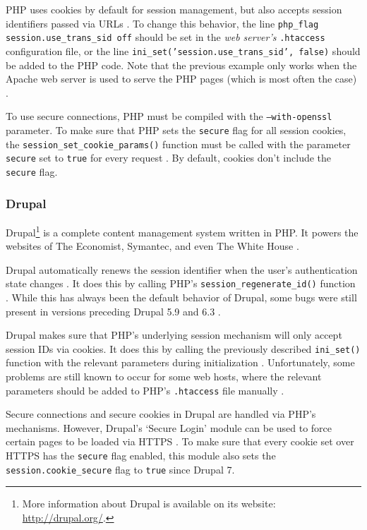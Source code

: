PHP uses cookies by default for session management, but also accepts session identifiers passed via URLs  \cite{Holovaty2008}. To change this behavior, the line \texttt{php\_flag session.use\_trans\_sid\ off} should be set in the \emph{web server's} \texttt{.htaccess} configuration file, or the line \texttt{ini\_set('session.use\_trans\_sid', false)} should be added to the PHP code. Note that the previous example only works when the Apache web server is used to serve the PHP pages (which is most often the case) \cite{PHPdisableURL}.

To use secure connections, PHP must be compiled with the \texttt{--with-openssl} parameter. To make sure that PHP sets the \texttt{secure} flag for all session cookies, the \texttt{session\_set\_cookie\_params()} function must be called with the parameter \texttt{secure} set to \texttt{true} for every request \cite{PHPsessionCookieParams}. By default, cookies don't include the \texttt{secure} flag.

\subsubsection{Drupal}

Drupal\footnote{More information about Drupal is available on its website: \url{http://drupal.org/}.} is a complete content management system written in PHP. It powers the websites of The Economist, Symantec, and even The White House \cite{DrupalCases,DrupalWhiteHouse}.

Drupal automatically renews the session identifier when the user's authentication state changes \cite{DrupalAuth}. It does this by calling PHP's \texttt{session\_regenerate\_id()} function \cite{DrupalRegenerate}. While this has always been the default behavior of Drupal, some bugs were still present in versions preceding Drupal 5.9 and 6.3 \cite{DrupalBug}.

Drupal makes sure that PHP's underlying session mechanism will only accept session IDs via cookies. It does this by calling the previously described \texttt{ini\_set()} function with the relevant parameters during initialization \cite{DrupalSettings}. Unfortunately, some problems are still known to occur for some web hosts, where the relevant parameters should be added to PHP's \texttt{.htaccess} file manually \cite{DrupalSIDurl}.

Secure connections and secure cookies in Drupal are handled via PHP's mechanisms. However, Drupal's `Secure Login' module can be used to force certain pages to be loaded via HTTPS \cite{DrupalSecureLogin}. To make sure that every cookie set over HTTPS has the \texttt{secure} flag enabled, this module also sets the \texttt{session.cookie\_secure} flag to \texttt{true} since Drupal 7.

